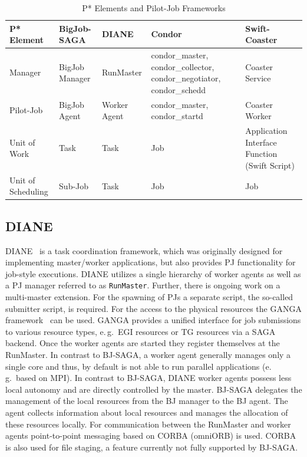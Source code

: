 \documentclass[conference,final]{IEEEtran}
\newcommand{\upp}{\vspace*{-0.5em}}
\begin{document}
\begin{table}[t]
\centering
\begin{tabular}{|p{2.5cm}|p{3cm}|p{3cm}|p{3cm}|p{3cm}|}
\hline
\textbf{P* Element} &\textbf{BigJob-SAGA} &\textbf{DIANE} &\textbf{Condor} 
&\textbf{Swift-Coaster}  \\
\hline
Manager &BigJob Manager & RunMaster & condor\_master, condor\_collector, condor\_negotiator, condor\_schedd &Coaster Service\\ 
\hline
Pilot-Job &BigJob Agent  & Worker Agent &condor\_master, condor\_startd &Coaster Worker\\
\hline
Unit of Work &Task &Task &Job &Application Interface Function (Swift Script)\\
\hline
Unit of Scheduling &Sub-Job &Task &Job &Job\\
\hline
\end{tabular}
\caption{P* Elements and Pilot-Job Frameworks} \label{table:bigjob-saga-diane}
\end{table}

\subsection{DIANE\upp\upp}

DIANE~\cite{Moscicki:908910} is a task coordination framework, which was
originally designed for implementing master/worker applications, but also
provides PJ functionality for job-style executions. DIANE utilizes a single
hierarchy of worker agents as well as a PJ manager referred to as
\texttt{RunMaster}. Further, there is ongoing work on a multi-master extension.
For the spawning of PJs a separate script, the so-called submitter script, is
required. For the access to the physical resources the GANGA 
framework~\cite{DBLP:journals/corr/abs-0902-2685} can be used. GANGA
provides a unified interface for job submissions to various resource types,
e.\,g.\ EGI resources or TG resources via a SAGA backend. Once the worker agents
are started they register themselves at the RunMaster. In contrast to BJ-SAGA, a
worker agent generally manages only a single core and thus, by default is not
able to run parallel applications (e.\,g.\ based on MPI). In contrast to
BJ-SAGA, DIANE worker agents possess less local autonomy and are directly
controlled by the master. BJ-SAGA delegates the management of the local
resources from the BJ manager to the BJ agent. The agent collects information
about local resources and manages the allocation of these resources locally. For
communication between the RunMaster and worker agents point-to-point messaging
based on CORBA (omniORB) is used. CORBA is also used for file staging, a feature
currently not fully supported by BJ-SAGA.
\end{document}

